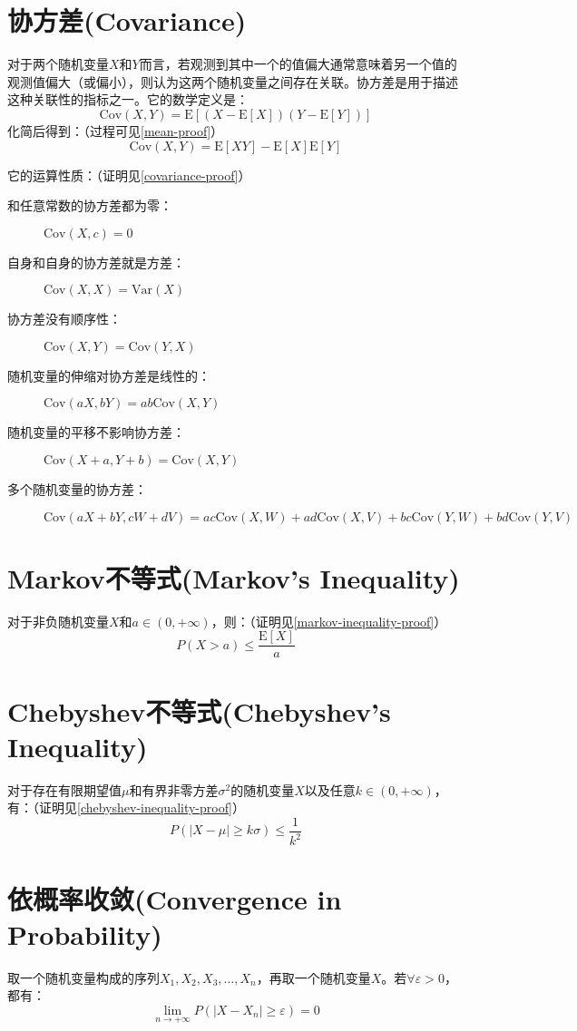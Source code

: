 \documentclass[UTF8]{ctexbook}
\begin{document}
\section{协方差(Covariance)}
\label{covariance}
对于两个随机变量$X$和$Y$而言，若观测到其中一个的值偏大通常意味着另一个值的观测值偏大（或偏小），则认为这两个随机变量之间存在关联。协方差是用于描述这种关联性的指标之一。它的数学定义是：
\[
	\mathrm{Cov}(X,Y)=\mathrm E[(X-\mathrm E[X])(Y-\mathrm E[Y])]
\]
化简后得到：（过程可见\ref{mean-proof}）
\[
	\mathrm{Cov}(X,Y)=\mathrm E[XY]-\mathrm E[X]\mathrm E[Y]
\]

它的运算性质：（证明见\ref{covariance-proof}）
\begin{description}
	\item [和任意常数的协方差都为零：]
	$\mathrm{Cov}(X, c)=0$
	\item [自身和自身的协方差就是方差：]
	$\mathrm{Cov}(X, X)=\mathrm{Var}(X)$
	\item [协方差没有顺序性：]
	$\mathrm{Cov}(X, Y)=\mathrm{Cov}(Y, X)$
	\item [随机变量的伸缩对协方差是线性的：]
	$\mathrm{Cov}(aX, bY)=ab\mathrm{Cov}(X, Y)$
	\item [随机变量的平移不影响协方差：]
	$\mathrm{Cov}(X+a, Y+b)=\mathrm{Cov}(X, Y)$
	\item [多个随机变量的协方差：]
	$\mathrm{Cov}(aX+bY, cW+dV)=ac\mathrm{Cov}(X, W)+ad\mathrm{Cov}(X, V)+bc\mathrm{Cov}(Y, W)+bd\mathrm{Cov}(Y, V)$
\end{description}
\section{Markov不等式(Markov's Inequality)}
\label{markov-inequality}
对于非负随机变量$X$和$a\in(0,+\infty)$，则：（证明见\ref{markov-inequality-proof}）
\[
	P(X>a)\leq\frac{\mathrm E[X]}{a}
\]

\section{Chebyshev不等式(Chebyshev's Inequality)}
\label{chebyshev-inequality}
对于存在有限期望值$\mu$和有界非零方差$\sigma^2$的随机变量$X$以及任意$k\in(0,+\infty)$，有：（证明见\ref{chebyshev-inequality-proof}）
\[
	P(|X-\mu|\geq k\sigma)\leq\frac{1}{k^2}
\]
\section{依概率收敛(Convergence in Probability)}
\label{convg-in-prob}
取一个随机变量构成的序列$X_1,X_2,X_3,\dots,X_n$，再取一个随机变量$X$。若$\forall\varepsilon>0$，都有：
\[
	\lim_{n\to+\infty}P(|X-X_n|\geq\varepsilon)=0
\]
\end{document}
